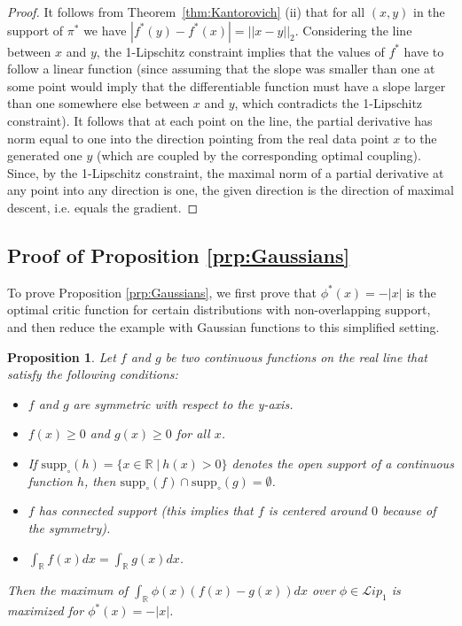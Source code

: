 \documentclass{article} %
\newcommand{\RR}[1][]{\mathbb{R}^{#1}}
\newcommand{\norm}[1]{||{#1}||_2}
\newcommand{\Li}[1]{\mathcal{L}ip_{#1}}
\newcommand{\suppo}[1]{\text{supp}_\circ({#1})}
\newtheorem{proposition}{Proposition}
\begin{document}
\begin{proof}
It follows from Theorem~\ref{thm:Kantorovich} (ii) that for all $(x,y)$ in the support of $\pi^*$ we have $|f^*(y)-f^*(x)|=\norm{x-y}$. 
Considering the line between $x$ and $y$, the 1-Lipschitz constraint implies that the values of $f^*$ have to follow a linear function (since assuming that the slope was smaller than one at some point would imply that the differentiable function must have a slope larger than one somewhere else between $x$ and $y$, which contradicts the 1-Lipschitz constraint).
It follows that at each point on the line, the partial derivative has norm equal to one into the direction pointing from the real data point $x$  to the generated one $y$ (which are coupled by the corresponding optimal coupling). Since, by the 1-Lipschitz constraint, the maximal norm of a partial derivative at any point into any direction is one, the given direction is the direction of maximal descent, i.e. equals the gradient. 
\end{proof}

\subsection{Proof of Proposition \ref{prp:Gaussians}}\label{appendix:NoDifGaussian}

To prove Proposition \ref{prp:Gaussians}, we first prove that $\phi^*(x)=-|x|$ is the optimal critic function for certain distributions with non-overlapping support, and then reduce the example with Gaussian functions to this simplified setting.

\begin{proposition}\label{prop:truncatedGaussian}
Let ${f}$ and ${g}$ be two continuous functions on the real line that satisfy the following conditions:
\begin{itemize}
\item $f$ and $g$ are symmetric with respect to the y-axis.
\item ${f}(x)\geq 0$ and ${g}(x)\geq 0$ for all $x$.
\item If $\suppo{h}=\{x\in\RR\ |\ h(x) > 0\}$ denotes the open support of a continuous function $h$, then $\suppo{{f}} \cap \suppo{{g}}=\emptyset$.   
\item ${f}$ has connected support (this implies that ${f}$ is centered around $0$ because of the symmetry).
\item $\int_{\RR} {f}(x) dx = \int_{\RR} {g}(x) dx$.
\end{itemize}
Then the maximum of $\int_{\RR}   \phi(x) ( {f}(x)- {g}(x) ) dx $ over $\phi\in \Li{1}$ is maximized for $\phi^*(x)=-|x|$.
\end{proposition}
\end{document}
